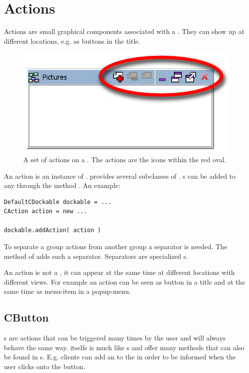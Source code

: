 \section{Actions} \label{sec:action}
Actions are small graphical components associated with a . They can show up at different locations, e.g. as buttons in the title.
\begin{figure}[ht]
\centering
\includegraphics[scale=0.75]{actions/actions}
\caption{A set of actions on a . The actions are the icons within the red oval.}
\label{fig:actions}
\end{figure}
An action is an instance of .  provides several subclasses of . s can be added to any  through the method . An example:
\begin{lstlisting}
DefaultCDockable dockable = ...
CAction action = new ...

dockable.addAction( action )
\end{lstlisting}

To separate a group actions from another group a separator is needed. The method  of  adds such a separator. Separators are specialized s.

An action is not a , it can appear at the same time at different locations with different views. For example an action can be seen as button in a title and at the same time as menu-item in a popup-menu.

\subsection{CButton}
s are actions that can be triggered many times by the user and will always behave the same way.  itselfs is much like s and offer many methods that can also be found in s. E.g. clients can add an  to the  in order to be informed when the user clicks onto the button.

